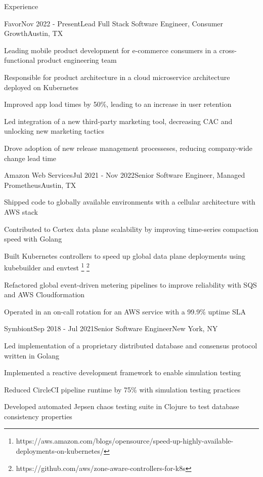 \documentclass[
	11pt, %
]{resume} %
\begin{document}
\begin{rSection}{Experience}

	\begin{rSubsection}{Favor}{Nov 2022 - Present}{Lead Full Stack Software Engineer, Consumer Growth}{Austin, TX}
        \item Leading mobile product development for e-commerce consumers in a cross-functional product engineering team
        \item Responsible for product architecture in a cloud microservice architecture deployed on Kubernetes
        \item Improved app load times by 50\%, leading to an increase in user retention
        \item Led integration of a new third-party marketing tool, decreasing CAC and unlocking new marketing tactics
        \item Drove adoption of new release management processeses, reducing company-wide change lead time
	\end{rSubsection}


    \begin{rSubsection}{Amazon Web Services}{Jul 2021 - Nov 2022}{Senior Software Engineer, Managed Prometheus}{Austin, TX}
        \item Shipped code to globally available environments with a cellular architecture with AWS stack
        \item Contributed to Cortex data plane scalability by improving time-series compaction speed with Golang
        \item Built Kubernetes controllers to speed up global data plane deployments using kubebuilder and envtest \footnote{https://aws.amazon.com/blogs/opensource/speed-up-highly-available-deployments-on-kubernetes/} \footnote{https://github.com/aws/zone-aware-controllers-for-k8s}
        \item Refactored global event-driven metering pipelines to improve reliability with SQS and AWS Cloudformation
        \item Operated in an on-call rotation for an AWS service with a 99.9\% uptime SLA
    \end{rSubsection}

    \begin{rSubsection}{Symbiont}{Sep 2018 - Jul 2021}{Senior Software Engineer}{New York, NY}
        \item Led implementation of a proprietary distributed database and consensus protocol written in Golang
        \item Implemented a reactive development framework to enable simulation testing
        \item Reduced CircleCI pipeline runtime by 75\% with simulation testing practices
        \item Developed automated Jepsen chaos testing suite in Clojure to test database consistency properties
    \end{rSubsection}


\end{rSection}
\end{document}
